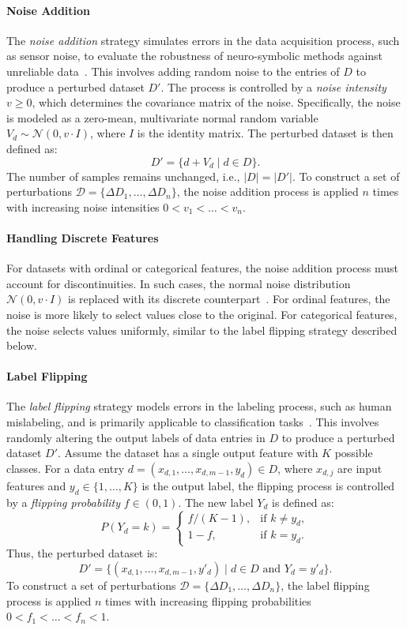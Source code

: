 %
\paragraph{Noise Addition}
%
The \emph{noise addition} strategy simulates errors in the data acquisition process, such as sensor noise, to evaluate the robustness of neuro-symbolic methods against unreliable data~\cite{placeholder}.
%
This involves adding random noise to the entries of \(D\) to produce a perturbed dataset \(D'\).
%
The process is controlled by a \emph{noise intensity} \(v \geq 0\), which determines the covariance matrix of the noise.
%
Specifically, the noise is modeled as a zero-mean, multivariate normal random variable \(V_d \sim \mathcal{N}(0, v \cdot I)\), where \(I\) is the identity matrix.
%
The perturbed dataset is then defined as:
%
\[
D' = \{d + V_d \mid d \in D\}.
\]
%
The number of samples remains unchanged, i.e., \(|D| = |D'|\).
%
To construct a set of perturbations \(\mathcal{D} = \{\Delta D_1, \ldots, \Delta D_n\}\), the noise addition process is applied \(n\) times with increasing noise intensities \(0 < v_1 < \ldots < v_n\).

%
\paragraph{Handling Discrete Features}
%
For datasets with ordinal or categorical features, the noise addition process must account for discontinuities.
%
In such cases, the normal noise distribution \(\mathcal{N}(0, v \cdot I)\) is replaced with its discrete counterpart~\cite{placeholder}.
%
For ordinal features, the noise is more likely to select values close to the original.
%
For categorical features, the noise selects values uniformly, similar to the label flipping strategy described below.

%
\paragraph{Label Flipping}
%
The \emph{label flipping} strategy models errors in the labeling process, such as human mislabeling, and is primarily applicable to classification tasks~\cite{placeholder}.
%
This involves randomly altering the output labels of data entries in \(D\) to produce a perturbed dataset \(D'\).
%
Assume the dataset has a single output feature with \(K\) possible classes.
%
For a data entry \(d = (x_{d,1}, \ldots, x_{d,m-1}, y_d) \in D\), where \(x_{d,j}\) are input features and \(y_d \in \{1, \ldots, K\}\) is the output label, the flipping process is controlled by a \emph{flipping probability} \(f \in (0, 1)\).
%
The new label \(Y_d\) is defined as:
%
\[
P(Y_d = k) =
\begin{cases}
f / (K - 1), & \text{if } k \neq y_d, \\
1 - f, & \text{if } k = y_d.
\end{cases}
\]
%
Thus, the perturbed dataset is:
%
\[
D' = \{(x_{d,1}, \ldots, x_{d,m-1}, y'_d) \mid d \in D \text{ and } Y_d = y'_d\}.
\]
%
To construct a set of perturbations \(\mathcal{D} = \{\Delta D_1, \ldots, \Delta D_n\}\), the label flipping process is applied \(n\) times with increasing flipping probabilities \(0 < f_1 < \ldots < f_n < 1\).

